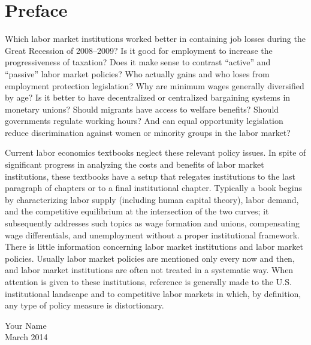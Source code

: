 \chapter*{Preface}

Which labor market institutions worked better in containing
job losses during the Great Recession
of 2008--2009? Is it good for employment to increase the progressiveness of
taxation? Does it make sense to contrast ``active'' and
``passive'' labor market policies? Who actually gains and who loses from
employment protection legislation? Why are minimum wages generally
diversified by age? Is it better to have decentralized or
centralized bargaining systems in monetary unions? Should migrants
have access to welfare benefits? Should governments regulate
working hours? And can equal opportunity legislation reduce 
discrimination against women or minority groups in the labor market? 

Current labor economics textbooks neglect these relevant
policy issues. In spite of significant progress in analyzing the
costs and benefits of labor market institutions, these textbooks have
a setup that relegates institutions to the last paragraph of
chapters or to a final institutional chapter. Typically a book
begins by characterizing labor supply (including human capital
theory), labor demand, and the competitive equilibrium at the 
intersection of the two curves; it
subsequently addresses such topics as wage formation and unions,
compensating wage differentials, and unemployment without a proper
institutional
framework. There is little information concerning labor market institutions
and labor market policies. Usually labor market policies are
mentioned only every now and then, and labor market institutions
are often not treated in a systematic way. When attention is given
to these institutions, reference is generally made to the
U.S. institutional landscape and to competitive labor markets in
which, by definition, any type of policy measure is distortionary.

\vspace{12pt}

\noindent Your Name\\
March 2014